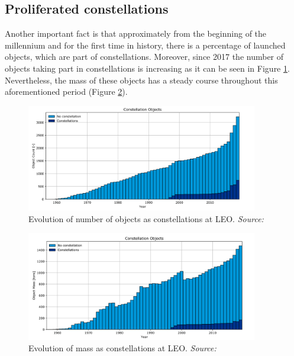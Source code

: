 \bigskip
\subsection{Proliferated constellations}
\bigskip

Another important fact is that approximately from the beginning of the millennium and for the first time in history, there is a percentage of launched objects, which are part of constellations. Moreover, since 2017 the number of objects taking part in constellations is increasing as it can be seen in Figure \ref{constellation_count_LEO}. Nevertheless, the mass of these objects has a steady course throughout this aforementioned period (Figure \ref{constellation_mass_LEO}). 

\begin{figure}
\centering
\includegraphics[width=0.9\textwidth]{Images/constellation_count_LEO.png}\caption{Evolution of number of objects as constellations at LEO. \textit{Source: \cite{ESA 2020}}}
\label{constellation_count_LEO} 
\end{figure}

\begin{figure}
\centering
\includegraphics[width=0.9\textwidth]{Images/constellation_mass_LEO.png}\caption{Evolution of mass as constellations at LEO. \textit{Source: \cite{ESA 2020}}}
\label{constellation_mass_LEO} 
\end{figure}

